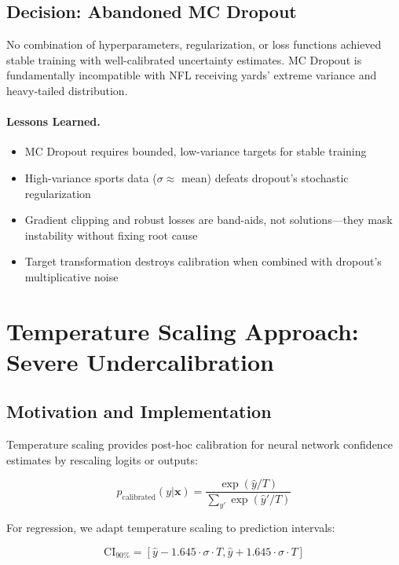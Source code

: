 \subsection{Decision: Abandoned MC Dropout}

No combination of hyperparameters, regularization, or loss functions achieved stable training with well-calibrated uncertainty estimates. MC Dropout is fundamentally incompatible with NFL receiving yards' extreme variance and heavy-tailed distribution.

\paragraph{Lessons Learned.}
\begin{itemize}
  \item MC Dropout requires bounded, low-variance targets for stable training
  \item High-variance sports data ($\sigma \approx$ mean) defeats dropout's stochastic regularization
  \item Gradient clipping and robust losses are band-aids, not solutions—they mask instability without fixing root cause
  \item Target transformation destroys calibration when combined with dropout's multiplicative noise
\end{itemize}

\section{Temperature Scaling Approach: Severe Undercalibration}

\subsection{Motivation and Implementation}

Temperature scaling provides post-hoc calibration for neural network confidence estimates by rescaling logits or outputs:

\begin{equation}
p_{\text{calibrated}}(y | \mathbf{x}) = \frac{\exp(\hat{y} / T)}{\sum_{y'} \exp(\hat{y}' / T)}
\end{equation}

For regression, we adapt temperature scaling to prediction intervals:

\begin{equation}
\text{CI}_{90\%} = [\hat{y} - 1.645 \cdot \sigma \cdot T, \hat{y} + 1.645 \cdot \sigma \cdot T]
\end{equation}

